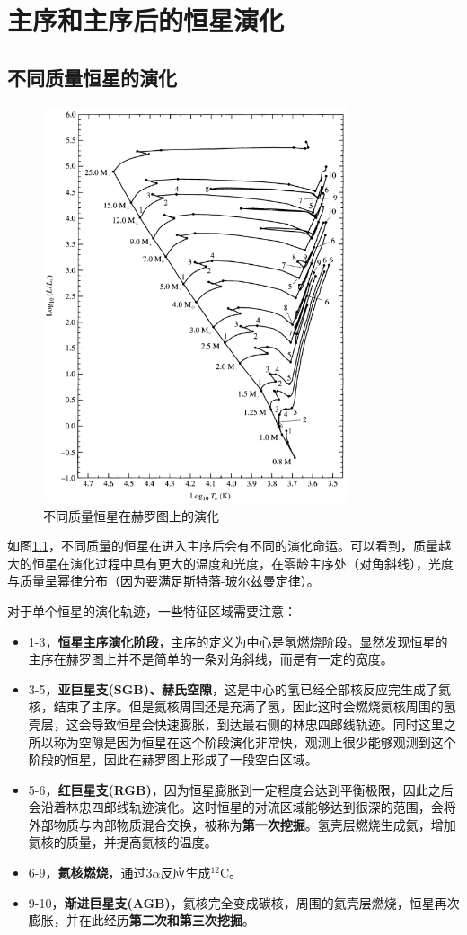 \chapter{主序和主序后的恒星演化}\label{sec:evolution}
\section{不同质量恒星的演化}
\begin{figure}[hbt]
  \centering
  \includegraphics[width=9cm]{chapters/13/HRD}
  \caption{不同质量恒星在赫罗图上的演化}
  \label{fig:HRDM}
\end{figure}

如图\ref{fig:HRDM}，不同质量的恒星在进入主序后会有不同的演化命运。可以看到，质量越大的恒星在演化过程中具有更大的温度和光度，在零龄主序处（对角斜线），光度与质量呈幂律分布（因为要满足斯特藩-玻尔兹曼定律）。

对于单个恒星的演化轨迹，一些特征区域需要注意：
\begin{itemize}
  \item 1-3，\textbf{恒星主序演化阶段}，主序的定义为中心是氢燃烧阶段。显然发现恒星的主序在赫罗图上并不是简单的一条对角斜线，而是有一定的宽度。
  \item 3-5，\textbf{亚巨星支(SGB)、赫氏空隙}，这是中心的氢已经全部核反应完生成了氦核，结束了主序。但是氦核周围还是充满了氢，因此这时会燃烧氦核周围的氢壳层，这会导致恒星会快速膨胀，到达最右侧的林忠四郎线轨迹。同时这里之所以称为空隙是因为恒星在这个阶段演化非常快，观测上很少能够观测到这个阶段的恒星，因此在赫罗图上形成了一段空白区域。
  \item 5-6，\textbf{红巨星支(RGB)}，因为恒星膨胀到一定程度会达到平衡极限，因此之后会沿着林忠四郎线轨迹演化。这时恒星的对流区域能够达到很深的范围，会将外部物质与内部物质混合交换，被称为\textbf{第一次挖掘}。氢壳层燃烧生成氦，增加氦核的质量，并提高氦核的温度。
  \item 6-9，\textbf{氦核燃烧}，通过3$\alpha$反应生成$^{12}$C。
  \item 9-10，\textbf{渐进巨星支(AGB)}，氦核完全变成碳核，周围的氦壳层燃烧，恒星再次膨胀，并在此经历\textbf{第二次和第三次挖掘}。
\end{itemize}



